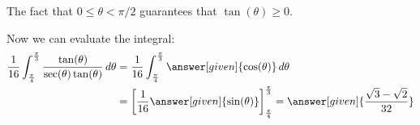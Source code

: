 \documentclass{ximera}
\begin{document}
\begin{example}
\begin{explanation}
The fact that $0\leq \theta < \pi/2$ guarantees that $\tan(\theta) \geq 0$. 
 
   Now we can evaluate the integral:
    \begin{align*}
     \frac{1}{16}\int_{\frac{\pi}{4}}^{\frac{\pi}{3}} \frac{\tan(\theta)}{\sec(\theta) \tan(\theta)}  \d \theta &= \frac{1}{16} \int_{\frac{\pi}{4}}^{\frac{\pi}{3}} \answer[given]{\cos(\theta)}  \d \theta\\
      &= \eval{\frac{1}{16}\answer[given]{\sin(\theta)}}_{\frac{\pi}{4}}^{\frac{\pi}{3}}= \answer[given]{\frac{\sqrt{3}-\sqrt{2}}{32}}
         \end{align*}

\end{explanation}
\end{example}

%
%
%
%
%
%
%
%
\end{document}
